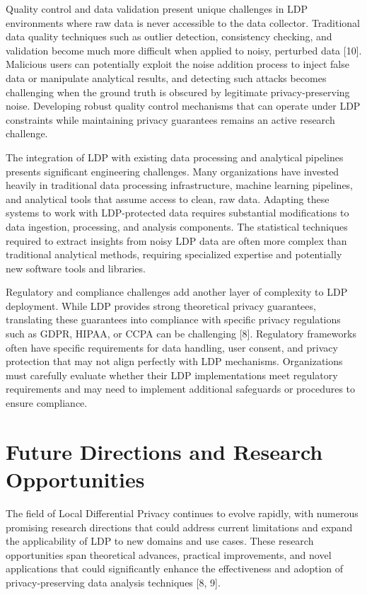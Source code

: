 \documentclass[conference]{IEEEtran}
\begin{document}
Quality control and data validation present unique challenges in LDP environments where raw data is never accessible to the data collector. Traditional data quality techniques such as outlier detection, consistency checking, and validation become much more difficult when applied to noisy, perturbed data [10]. Malicious users can potentially exploit the noise addition process to inject false data or manipulate analytical results, and detecting such attacks becomes challenging when the ground truth is obscured by legitimate privacy-preserving noise. Developing robust quality control mechanisms that can operate under LDP constraints while maintaining privacy guarantees remains an active research challenge.

The integration of LDP with existing data processing and analytical pipelines presents significant engineering challenges. Many organizations have invested heavily in traditional data processing infrastructure, machine learning pipelines, and analytical tools that assume access to clean, raw data. Adapting these systems to work with LDP-protected data requires substantial modifications to data ingestion, processing, and analysis components. The statistical techniques required to extract insights from noisy LDP data are often more complex than traditional analytical methods, requiring specialized expertise and potentially new software tools and libraries.

Regulatory and compliance challenges add another layer of complexity to LDP deployment. While LDP provides strong theoretical privacy guarantees, translating these guarantees into compliance with specific privacy regulations such as GDPR, HIPAA, or CCPA can be challenging [8]. Regulatory frameworks often have specific requirements for data handling, user consent, and privacy protection that may not align perfectly with LDP mechanisms. Organizations must carefully evaluate whether their LDP implementations meet regulatory requirements and may need to implement additional safeguards or procedures to ensure compliance.

\section{Future Directions and Research Opportunities}
The field of Local Differential Privacy continues to evolve rapidly, with numerous promising research directions that could address current limitations and expand the applicability of LDP to new domains and use cases. These research opportunities span theoretical advances, practical improvements, and novel applications that could significantly enhance the effectiveness and adoption of privacy-preserving data analysis techniques [8, 9].
\end{document}
